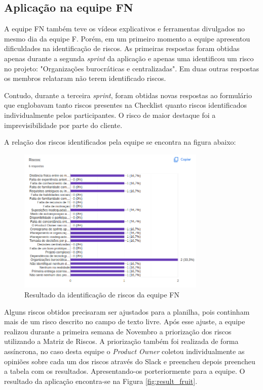 \documentclass[
    12pt,       %
    openright,      %
    twoside,      %
    a4paper,      %
    english,      %
    french,       %
    spanish,      %
    brazil,       %
    ]{abntex2}
\begin{document}
\subsection{Aplicação na equipe FN}

A equipe FN também teve os vídeos explicativos e ferramentas divulgados no mesmo dia da equipe F. Porém, em um primeiro momento a equipe apresentou dificuldades na identificação de riscos. As primeiras respostas foram obtidas apenas durante a segunda \textit{sprint} da aplicação e apenas uma identificou um risco no projeto: "Organizações burocráticas e centralizadas". Em duas outras respostas os membros relataram não terem identificado riscos.

Contudo, durante a terceira \textit{sprint}, foram obtidas novas respostas ao formulário que englobavam tanto riscos presentes na Checklist quanto riscos identificados individualmente pelos participantes. O risco de maior destaque foi a imprevisibilidade por parte do cliente.

A relação dos riscos identificados pela equipe se encontra na figura abaixo:

\begin{figure}[H]
    \centering
    \includegraphics[width=0.8\textwidth]{src/tex/img/riscos-fruit.png}
    \caption{Resultado da identificação de riscos da equipe FN}
    \label{fig:risk_fruit}
\end{figure}

Alguns riscos obtidos precisaram ser ajustados para a planilha, pois continham mais de um risco descrito no campo de texto livre. Após esse ajuste, a equipe realizou durante a primeira semana de Novembro a priorização dos riscos utilizando a Matriz de Riscos. A priorização também foi realizada de forma assíncrona, no caso desta equipe o \textit{Product Owner} coletou individualmente as opiniões sobre cada um dos riscos através do Slack e preencheu depois preencheu a tabela com os resultados. Apresentando-os porteriormente para a equipe. O resultado da aplicação encontra-se na Figura \ref{fig:result_fruit}.
\end{document}
